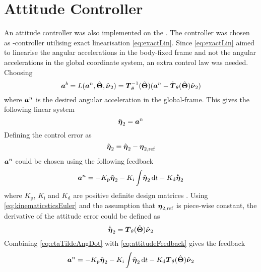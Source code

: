 \section{Attitude Controller}  
An attitude controller was also implemented on the \abbrROV. The controller was chosen as \abbrPID-controller utilising exact linearisation \eqref{eq:exactLin}.
Since \eqref{eq:exactLin} aimed to linearise the angular accelerations in the body-fixed frame and not the angular accelerations in the global coordinate system, an extra control law was needed.
Choosing 
\begin{equation}\label{eq:anLaw}
\accVector^b =L(\accVector^n,\hat{\eulerAngles},\hat{\nuVector}_2)=\boldsymbol{T}^{-1}_\theta(\hat{\eulerAngles})(\accVector^n - \dot{\boldsymbol{T}}_\theta(\hat{\eulerAngles})\hat{\nuVector}_2)\\
\end{equation} where $\accVector^n$ is the desired angular acceleration in the global-frame. This gives the following linear system \begin{equation}
\ddot{\boldsymbol{\eta}}_2=\accVector^n 
\end{equation}
Defining the control error as
\begin{equation}
\etaTildeAng = \hat{\etaVector}_2 - \etaVectorAng[,{\text{ref}}] 
\end{equation}
$\accVector^n$ could be chosen using the following feedback 
\begin{equation}\label{eq:attitudeFeedback}
\accVector^n=-K_{\text{p}} \etaTildeAng - K_{\text{i}}\int \! \etaTildeAng \, \mathrm{d}t - K_{\text{d}} \etaTildeAngdot
\end{equation}
where $K_{\text{p}}$, $K_{\text{i}}$ and $K_{\text{d}}$ are positive definite design matrices \citep[p. 453]{fossen2011}. 
Using \eqref{eq:kinematicsticsEuler} and the assumption that $\etaVectorAng[,{\text{ref}}]$ is piece-wise constant, the derivative of the attitude error could be defined as 
\begin{equation}\label{eq:etaTildeAngDot}
\etaTildeAngdot = \boldsymbol{T}_\theta(\hat{\boldsymbol{\Theta}})\hat{\nuVector}_{2}
\end{equation}
Combining \eqref{eq:etaTildeAngDot} with \eqref{eq:attitudeFeedback} gives the feedback
\begin{equation}
\accVector^n=-K_{\text{p}} \etaTildeAng - K_{\text{i}}\int \! \etaTildeAng \, \mathrm{d}t - K_{\text{d}} \boldsymbol{T}_\theta(\hat{\boldsymbol{\Theta}})\hat{\nuVector}_{2}
\end{equation}

